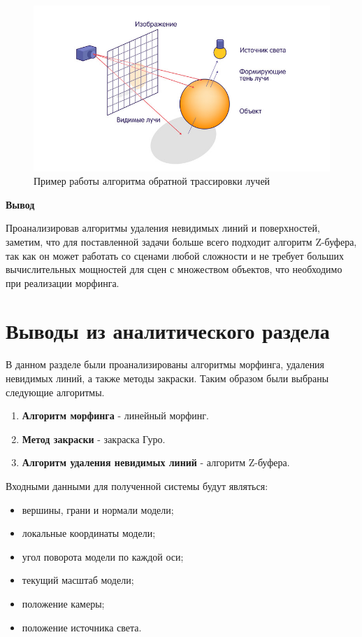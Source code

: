 \begin{figure}[H]
	\centering
	\includegraphics[scale=3]{images/ray_traycing.jpeg}
	\caption{Пример работы алгоритма обратной трассировки лучей}
	\label{fig:ray_traycing}
\end{figure}

\textbf{Вывод}

Проанализировав алгоритмы удаления невидимых линий и поверхностей, заметим, что для поставленной задачи больше всего подходит алгоритм Z-буфера, так как он может работать со сценами любой сложности и не требует больших вычислительных мощностей для сцен с множеством объектов, что необходимо при реализации морфинга.


\section*{Выводы из аналитического раздела}

В данном разделе были проанализированы алгоритмы морфинга, удаления невидимых линий, а также методы закраски.
Таким образом были выбраны следующие алгоритмы.
\begin{enumerate}
	\item \textbf{Алгоритм морфинга} - линейный морфинг.
	\item \textbf{Метод закраски} - закраска Гуро.
	\item \textbf{Алгоритм удаления невидимых линий} - алгоритм Z-буфера.
\end{enumerate}

Входными данными для полученной системы будут являться:
\begin{itemize}
	\item вершины, грани и нормали модели;
	\item локальные координаты модели;
	\item угол поворота модели по каждой оси;
	\item текущий масштаб модели;
	\item положение камеры;
	\item положение источника света.
\end{itemize}